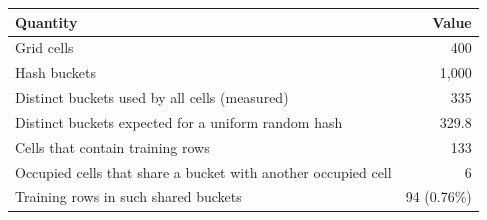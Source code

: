\begin{tabular}{p{10cm}r}
\toprule
Quantity & Value \\
\midrule
Grid cells & 400 \\
Hash buckets & 1,000 \\
Distinct buckets used by all cells (measured) & 335 \\
Distinct buckets expected for a uniform random hash & 329.8 \\
Cells that contain training rows & 133 \\
Occupied cells that share a bucket with another occupied cell & 6 \\
Training rows in such shared buckets & 94 (0.76\%) \\
\bottomrule
\end{tabular}
